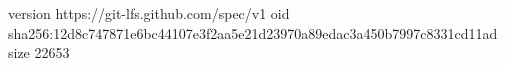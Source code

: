 version https://git-lfs.github.com/spec/v1
oid sha256:12d8c747871e6bc44107e3f2aa5e21d23970a89edac3a450b7997c8331cd11ad
size 22653
